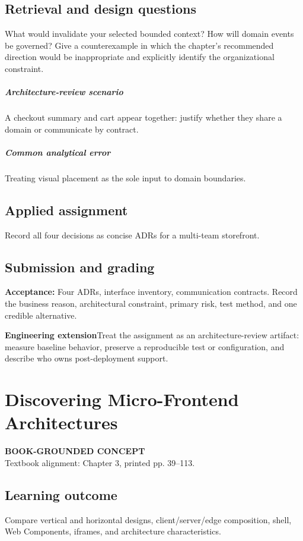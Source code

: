 \documentclass[11pt,letterpaper,oneside]{report}
\newcommand{\based}[1]{\begin{sourcebox}\textbf{BOOK-GROUNDED CONCEPT}\\#1\end{sourcebox}}
\newcommand{\criterion}[1]{\textbf{Acceptance:} #1}
\begin{document}
\section{Retrieval and design questions}
What would invalidate your selected bounded context? How will domain events be governed? Give a counterexample in which the chapter's recommended direction would be inappropriate and explicitly identify the organizational constraint.
\paragraph{Architecture-review scenario} A checkout summary and cart appear together: justify whether they share a domain or communicate by contract.
\paragraph{Common analytical error} Treating visual placement as the sole input to domain boundaries.
\section{Applied assignment}
Record all four decisions as concise ADRs for a multi-team storefront.
\section{Submission and grading}
\criterion{Four ADRs, interface inventory, communication contracts. Record the business reason, architectural constraint, primary risk, test method, and one credible alternative.}
\begin{engineerbox}\textbf{Engineering extension}\newline Treat the assignment as an architecture-review artifact: measure baseline behavior, preserve a reproducible test or configuration, and describe who owns post-deployment support.\end{engineerbox}

\chapter{Discovering Micro-Frontend Architectures}
\based{Textbook alignment: Chapter 3, printed pp. 39--113.}
\section{Learning outcome}
Compare vertical and horizontal designs, client/server/edge composition, shell, Web Components, iframes, and architecture characteristics.
\end{document}
